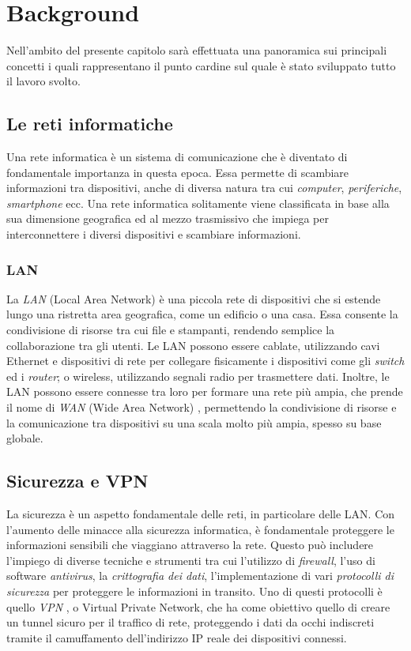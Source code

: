\chapter{Background} %
%
\begin{citazione}
Nell'ambito del presente capitolo sarà effettuata una panoramica sui principali concetti i quali rappresentano il punto cardine sul quale è stato sviluppato tutto il lavoro svolto.
\end{citazione}
\newpage

\section{Le reti informatiche}
Una rete informatica è un sistema di comunicazione che è diventato di fondamentale importanza in questa epoca. Essa permette di scambiare informazioni tra dispositivi, anche di diversa natura tra cui \emph{computer}, \emph{periferiche}, \emph{smartphone} ecc. Una rete informatica solitamente viene classificata in base alla sua dimensione geografica ed al mezzo trasmissivo che impiega per interconnettere i diversi dispositivi e scambiare informazioni.

\subsection{LAN}
La \emph{LAN} (Local Area Network) \cite{lan} è una piccola rete di dispositivi che si estende lungo una ristretta area geografica, come un edificio o una casa. Essa consente la condivisione di risorse tra cui file e stampanti, rendendo semplice la collaborazione tra gli utenti. Le LAN possono essere cablate, utilizzando cavi Ethernet e dispositivi di rete per collegare fisicamente i dispositivi come gli \emph{switch} ed i \emph{router}; o wireless, utilizzando segnali radio per trasmettere dati. Inoltre, le LAN possono essere connesse tra loro per formare una rete più ampia, che prende il nome di \emph{WAN} (Wide Area Network) \cite{wan}, permettendo la condivisione di risorse e la comunicazione tra dispositivi su una scala molto più ampia, spesso su base globale.

\section{Sicurezza e VPN}
La sicurezza è un aspetto fondamentale delle reti, in particolare delle LAN. Con l’aumento delle minacce alla sicurezza informatica, è fondamentale proteggere le informazioni sensibili che viaggiano attraverso la rete. Questo può includere l'impiego di diverse tecniche e strumenti tra cui l’utilizzo di \emph{firewall}, l’uso di software \emph{antivirus}, la \emph{crittografia dei dati}, l’implementazione di vari \emph{protocolli di sicurezza} per proteggere le informazioni in transito. Uno di questi protocolli è quello \emph{VPN} \cite{vpn}, o Virtual Private Network, che ha come obiettivo quello di creare un tunnel sicuro per il traffico di rete, proteggendo i dati da occhi indiscreti tramite il camuffamento dell'indirizzo IP reale dei dispositivi connessi.

